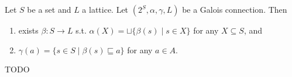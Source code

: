 Let $S$ be a set and $L$ a lattice. Let $(2^S, \alpha, \gamma, L)$ be a Galois connection. Then
\begin{enumerate}
	\item exists $\beta: S \rightarrow L$ s.t. $\alpha(X) = \sqcup\{\beta(s) \mid s \in X\}$ for any $X \subseteq S$, and
	\item $\gamma(a) = \{s \in S \mid \beta(s) \sqsubseteq a \}$ for any $a \in A$.
\end{enumerate}
TODO